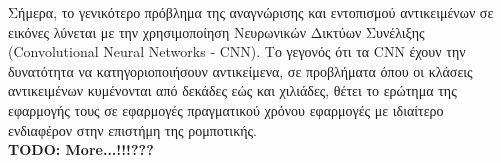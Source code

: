 Σήμερα, το γενικότερο πρόβλημα της αναγνώρισης και εντοπισμού αντικειμένων σε εικόνες
λύνεται με την χρησιμοποίηση Νευρωνικών Δικτύων Συνέλιξης (Convolutional Neural Networks - CNN).
Το γεγονός ότι τα CNN έχουν την δυνατότητα να κατηγοριοποιήσουν αντικείμενα,
σε προβλήματα όπου οι κλάσεις αντικειμένων κυμένονται από δεκάδες εώς και χιλιάδες,
θέτει το ερώτημα της εφαρμογής τους σε εφαρμογές πραγματικού χρόνου εφαρμογές
με ιδιαίτερο ενδιαφέρον στην επιστήμη της ρομποτικής.
\\

\textbf{TODO: More...!!!???}




